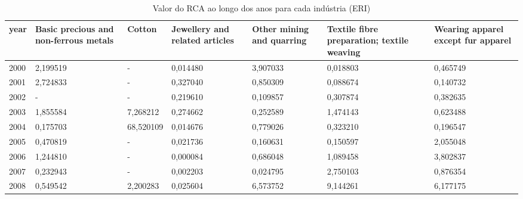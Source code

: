 \begin{table}
\centering
\caption{Valor do RCA ao longo dos anos para cada indústria (ERI)}
\begin{tabular}{p{1cm}p{2cm}p{2cm}p{2cm}p{2cm}p{2cm}p{2cm}}
\toprule
 year &  Basic precious and non-ferrous metals &    Cotton &  Jewellery and related articles &  Other mining and quarring &  Textile fibre preparation; textile weaving &  Wearing apparel except fur apparel \\
\midrule
 2000 &                               2,199519 &         - &                        0,014480 &                   3,907033 &                                    0,018803 &                            0,465749 \\
 2001 &                               2,724833 &         - &                        0,327040 &                   0,850309 &                                    0,088674 &                            0,140732 \\
 2002 &                                      - &         - &                        0,219610 &                   0,109857 &                                    0,307874 &                            0,382635 \\
 2003 &                               1,855584 &  7,268212 &                        0,274662 &                   0,252589 &                                    1,474143 &                            0,623488 \\
 2004 &                               0,175703 & 68,520109 &                        0,014676 &                   0,779026 &                                    0,323210 &                            0,196547 \\
 2005 &                               0,470819 &         - &                        0,021736 &                   0,160631 &                                    0,150597 &                            2,055048 \\
 2006 &                               1,244810 &         - &                        0,000084 &                   0,686048 &                                    1,089458 &                            3,802837 \\
 2007 &                               0,232943 &         - &                        0,002203 &                   0,024795 &                                    2,750103 &                            0,876354 \\
 2008 &                               0,549542 &  2,200283 &                        0,025604 &                   6,573752 &                                    9,144261 &                            6,177175 \\

\end{tabular}
\end{table}
